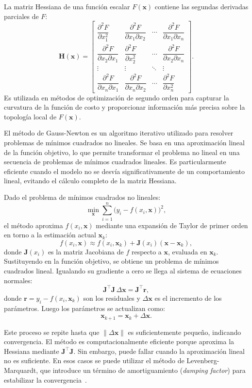 La matriz Hessiana de una función escalar $F(\mathbf{x})$ contiene las segundas derivadas parciales de $F$:
\[
\mathbf{H}(\mathbf{x}) =
\begin{bmatrix}
\dfrac{\partial^2 F}{\partial x_1^2} & \dfrac{\partial^2 F}{\partial x_1 \partial x_2} & \cdots & \dfrac{\partial^2 F}{\partial x_1 \partial x_n} \\[8pt]
\dfrac{\partial^2 F}{\partial x_2 \partial x_1} & \dfrac{\partial^2 F}{\partial x_2^2} & \cdots & \dfrac{\partial^2 F}{\partial x_2 \partial x_n} \\[8pt]
\vdots & \vdots & \ddots & \vdots \\[4pt]
\dfrac{\partial^2 F}{\partial x_n \partial x_1} & \dfrac{\partial^2 F}{\partial x_n \partial x_2} & \cdots & \dfrac{\partial^2 F}{\partial x_n^2}
\end{bmatrix}.
\]
Es utilizada en métodos de optimización de segundo orden para capturar la curvatura de la función de costo y proporcionar información más precisa sobre la topología local de $F(\mathbf{x})$.

El método de Gauss-Newton es un algoritmo iterativo utilizado para resolver problemas de mínimos cuadrados no lineales. Se basa en una aproximación lineal de la función objetivo, lo que permite transformar el problema no lineal en una secuencia de problemas de mínimos cuadrados lineales. Es particularmente eficiente cuando el modelo no se desvía significativamente de un comportamiento lineal, evitando el cálculo completo de la matriz Hessiana.

Dado el problema de mínimos cuadrados no lineales:
\[
\min_{\mathbf{x}} \sum_{i=1}^{n} \bigl(y_i - f(x_i, \mathbf{x})\bigr)^2,
\]
el método aproxima $f(x_i, \mathbf{x})$ mediante una expansión de Taylor de primer orden en torno a la estimación actual $\mathbf{x}_k$:
\[
f(x_i, \mathbf{x}) \approx f(x_i, \mathbf{x}_k) + \mathbf{J}(x_i)(\mathbf{x} - \mathbf{x}_k),
\]
donde $\mathbf{J}(x_i)$ es la matriz Jacobiana de $f$ respecto a $\mathbf{x}$, evaluada en $\mathbf{x}_k$. Sustituyendo en la función objetivo, se obtiene un problema de mínimos cuadrados lineal. Igualando su gradiente a cero se llega al sistema de ecuaciones normales:
\[
\mathbf{J}^\top \mathbf{J}\,\Delta\mathbf{x} = \mathbf{J}^\top \mathbf{r},
\]
donde $\mathbf{r} = y_i - f(x_i, \mathbf{x}_k)$ son los residuales y $\Delta\mathbf{x}$ es el incremento de los parámetros. Luego los parámetros se actualizan como:
\[
\mathbf{x}_{k+1} = \mathbf{x}_k + \Delta\mathbf{x}.
\]

Este proceso se repite hasta que $\|\Delta\mathbf{x}\|$ es suficientemente pequeño, indicando convergencia. El método es computacionalmente eficiente porque aproxima la Hessiana mediante $\mathbf{J}^\top\mathbf{J}$. Sin embargo, puede fallar cuando la aproximación lineal no es suficiente. En esos casos se puede utilizar el método de Levenberg-Marquardt, que introduce un término de amortiguamiento (\textit{damping factor}) para estabilizar la convergencia~\cite{nocedal2006numerical}.

